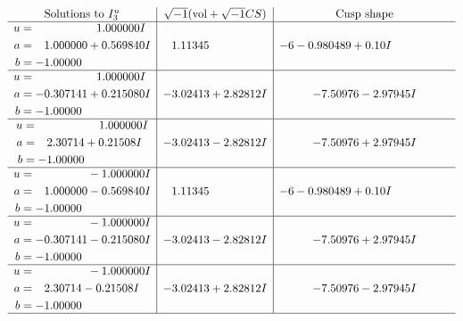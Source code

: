 \documentclass[1p]{elsarticle_modified}
\theoremstyle{definition}
\newcommand{\I}{\sqrt{-1}}
\begin{document}
$$\begin{array}{c|c|c}  
\text{Solutions to }I^u_{3}& \I (\text{vol} + \sqrt{-1}CS) & \text{Cusp shape}\\
 \hline 
\begin{aligned}
u &= \phantom{-0.000000 -}1.000000 I \\
a &= \phantom{-}1.000000 + 0.569840 I \\
b &= -1.00000\phantom{ +0.000000I}\end{aligned}
 & \phantom{-}1.11345\phantom{ +0.000000I} &                  -6
-0.980489 + 0. 10   I\phantom{ +0.000000I} \\ \hline\begin{aligned}
u &= \phantom{-0.000000 -}1.000000 I \\
a &= -0.307141 + 0.215080 I \\
b &= -1.00000\phantom{ +0.000000I}\end{aligned}
 & -3.02413 + 2.82812 I & -7.50976 - 2.97945 I \\ \hline\begin{aligned}
u &= \phantom{-0.000000 -}1.000000 I \\
a &= \phantom{-}2.30714 + 0.21508 I \\
b &= -1.00000\phantom{ +0.000000I}\end{aligned}
 & -3.02413 - 2.82812 I & -7.50976 + 2.97945 I \\ \hline\begin{aligned}
u &= \phantom{-0.000000 } -1.000000 I \\
a &= \phantom{-}1.000000 - 0.569840 I \\
b &= -1.00000\phantom{ +0.000000I}\end{aligned}
 & \phantom{-}1.11345\phantom{ +0.000000I} &                  -6
-0.980489 + 0. 10   I\phantom{ +0.000000I} \\ \hline\begin{aligned}
u &= \phantom{-0.000000 } -1.000000 I \\
a &= -0.307141 - 0.215080 I \\
b &= -1.00000\phantom{ +0.000000I}\end{aligned}
 & -3.02413 - 2.82812 I & -7.50976 + 2.97945 I \\ \hline\begin{aligned}
u &= \phantom{-0.000000 } -1.000000 I \\
a &= \phantom{-}2.30714 - 0.21508 I \\
b &= -1.00000\phantom{ +0.000000I}\end{aligned}
 & -3.02413 + 2.82812 I & -7.50976 - 2.97945 I\\
 \hline 
 \end{array}$$\newpage
\end{document}
